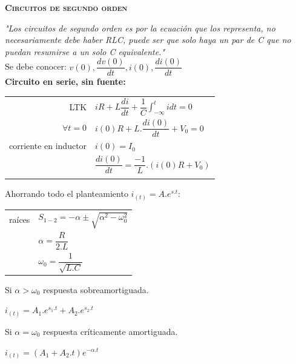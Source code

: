 \documentclass[11pt,a4paper,twocolumn]{article}
\begin{document}
	\begin{center}
		\large\textsc{\textbf{Circuitos de segundo orden}}
	\end{center}
	 
	
	\textsl{"Los circuitos de segundo orden es por la ecuación que los representa, no necesariamente debe haber RLC, puede ser que solo haya un par de C que no puedan resumirse a un solo C equivalente."}\\
	
	Se debe conocer: $v(0),\dfrac{dv(0)}{dt},i(0),\dfrac{di(0)}{dt}$\\

	\textbf{Circuito en serie, sin fuente:}\\
		\begin{tabular}{r | l} \vspace{.2cm}
		LTK & $iR+L\dfrac{di}{dt}+\dfrac{1}{C}\int_{-\infty}^{t}idt=0 $ \\ \vspace{.2cm}
		$\forall t=0$ & $i(0)R+L.\dfrac{di(0)}{dt}+V_{0}=0 $ \\ \vspace{.2cm}
		corriente en inductor& $i(0)=I_{0}$ \\ \vspace{.2cm}
		&$\dfrac{di(0)}{dt}= \dfrac{-1}{L}.(i(0)R+V_{0}) $\\ \vspace{.2cm}
		\end{tabular}
	Ahorrando todo el planteamiento $i_{(t)}=A.e^{s.t}$:
		\begin{tabular}{r | l} \vspace{.2cm}
		raíces& $S_{1-2}=-\alpha\pm \sqrt{\alpha^{2}-\omega_{0}^{2}}$\\ \vspace{.2cm}
		&$\alpha=\dfrac{R}{2.L}$ \\ \vspace{.2cm}
		&$\omega_{0}=\dfrac{1}{\sqrt{L.C}}$ \vspace{.2cm}
		\end{tabular}
	
		Si $\alpha > \omega_{0}$ respuesta sobreamortiguada.
		\begin{center}
			$i_{(t)}=A_{1}.e^{s_{1}.t}+A_{2}.e^{s_{2}.t}$
		\end{center}
	
		Si $\alpha = \omega_{0}$ respuesta críticamente amortiguada.
		\begin{center}
			$i_{(t)}=(A_{1}+A_{2}.t)e^{-\alpha.t}$
		\end{center}
		
\end{document}
